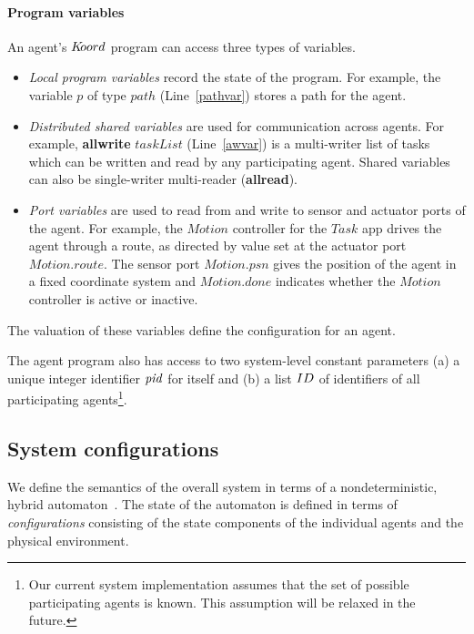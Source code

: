 \paragraph{Program variables}
An agent's $K\kern-2pt oord$ program can access three types of variables. 
%
\begin{itemize}
	\item {\em Local program variables\/} record the state of the program. For example, the variable $p$ of type $\mathit{path}$ (Line~\ref{pathvar}) stores a path for the agent. 
\item {\em Distributed shared variables\/} are used for communication across agents.  For example, {\bf allwrite} $\mathit{taskList}$ (Line~\ref{awvar}) is a multi-writer list of tasks which can be written and read by any participating agent. Shared variables can also be single-writer multi-reader ({\bf allread}). 
\item {\em Port variables\/} are used to read from and write to sensor and actuator ports of the agent. For example, the $\mathit{Motion}$ controller for the $\mathit{Task}$ app  drives the agent  through a route, as directed by value set at the actuator port $\mathit{Motion.route}$. The sensor port $\mathit{Motion.psn}$ gives the position of the agent in a fixed coordinate system and $\mathit{Motion.done}$ indicates  whether the $\mathit{Motion}$ controller is active or inactive.
\end{itemize}
The valuation of these variables define the configuration for an agent. 

The agent program also has access to two system-level constant parameters (a) a unique integer identifier $\mathit{pid}$ for itself and (b) a list $ID$ of identifiers of all participating agents\footnote{Our current system implementation assumes that the set of possible participating agents is known. This assumption will be relaxed in the future.}. 


 
\subsection{System configurations}

We define the semantics of the overall system in terms of a nondeterministic, hybrid automaton~\cite{TIOAmon}. The state of the automaton is defined in terms of {\em configurations\/} consisting of the state components of the individual agents and the physical environment. 

